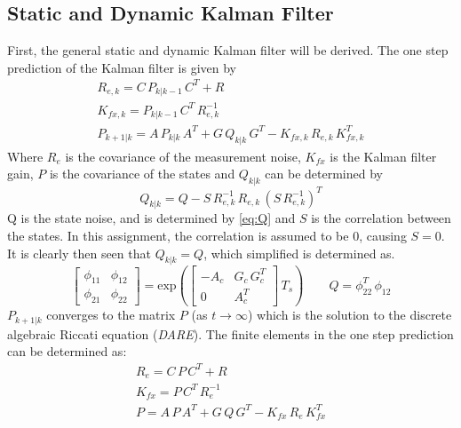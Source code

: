 \subsection{Static and Dynamic Kalman Filter}
First, the general static and dynamic Kalman filter will be derived. The one step prediction of the Kalman filter is given by
\begin{equation}
    \begin{gathered}
        R_{e,k}=C\,P_{k|k-1}\,C^T+R\\
        K_{fx,k}=P_{k|k-1}\,C^T\,R_{e,k}^{-1}\\
        P_{k+1|k}=A\,P_{k|k}\,A^T+G\,Q_{k|k}\,G^T-K_{fx,k}\,R_{e,k}\,K_{fx,k}^T
    \end{gathered}
\end{equation}
Where $R_e$ is the covariance of the measurement noise, $K_{fx}$ is the Kalman filter gain, $P$ is the covariance of the states and $Q_{k|k}$ can be determined by
\begin{equation}
    Q_{k|k}=Q-S\,R_{e,k}^{-1}\,R_{e,k}\,(S\,R_{e,k}^{-1})^T
\end{equation}
Q is the state noise, and is determined by \cref{eq:Q} and $S$ is the correlation between the states. In this assignment, the correlation is assumed to be 0, causing $S=0$. It is clearly then seen that $Q_{k|k}=Q$, which simplified is determined as.
\begin{equation}
    \begin{bmatrix}
        \phi_{11} & \phi_{12} \\ \phi_{21} & \phi_{22}
    \end{bmatrix}=
    \text{exp}\left(\begin{bmatrix} 
        -A_c & G_c\,G_c^T\\ 0 & A_c^T 
    \end{bmatrix}\,T_s\right)
    \qquad
    Q=\phi_{22}^T\,\phi_{12}
    \label{eq:Q}
\end{equation}
$P_{k+1|k}$ converges to the matrix $P$ (as $t\xrightarrow{}\infty$) which is the solution to the discrete algebraic Riccati equation (\textit{DARE}). The finite elements in the one step prediction can be determined as:
\begin{equation}
    \begin{gathered}
        R_{e}=C\,P\,C^T+R\\
        K_{fx}=P\,C^T\,R_{e}^{-1}\\
        P=A\,P\,A^T+G\,Q\,G^T-K_{fx}\,R_{e}\,K_{fx}^T
    \end{gathered}
\end{equation}
